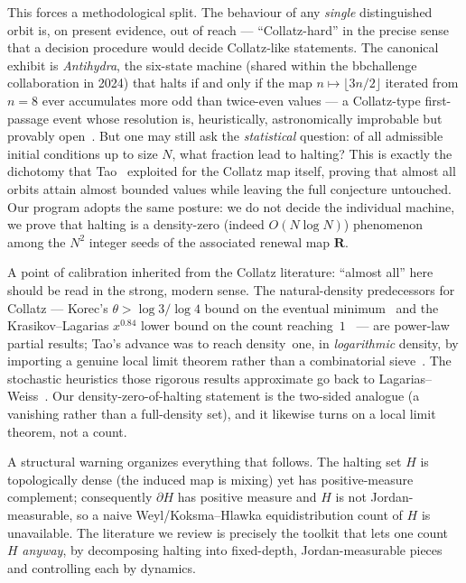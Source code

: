 \documentclass[11pt]{article}
\newcommand{\R}{\mathbf{R}}
\begin{document}
This forces a methodological split. The behaviour of any \emph{single}
distinguished orbit is, on present evidence, out of reach --- ``Collatz-hard''
in the precise sense that a decision procedure would decide Collatz-like
statements. The canonical exhibit is \emph{Antihydra}, the six-state machine
(shared within the bbchallenge collaboration in 2024) that halts if and only if
the map $n\mapsto\lfloor3n/2\rfloor$ iterated from $n=8$ ever accumulates more
odd than twice-even values --- a Collatz-type first-passage event whose
resolution is, heuristically, astronomically improbable but provably
open~\cite{bbchallenge2024}. But one may still ask the \emph{statistical}
question: of all admissible initial conditions up to size $N$, what fraction
lead to halting? This is exactly the dichotomy that Tao~\cite{Tao2022}
exploited for the Collatz map itself, proving that almost all orbits attain
almost bounded values while leaving the full conjecture untouched. Our program
adopts the same posture: we do not decide the individual machine, we prove that
halting is a density-zero (indeed $O(N\log N)$) phenomenon among the $N^2$
integer seeds of the associated renewal map $\R$.

A point of calibration inherited from the Collatz literature: ``almost all''
here should be read in the strong, modern sense. The natural-density
predecessors for Collatz --- Korec's $\theta>\log3/\log4$ bound on the eventual
minimum~\cite{Korec1994} and the Krasikov--Lagarias $x^{0.84}$ lower bound on
the count reaching~$1$~\cite{KrasikovLagarias2003} --- are power-law partial
results; Tao's advance was to reach density~one, in \emph{logarithmic} density,
by importing a genuine local limit theorem rather than a combinatorial
sieve~\cite{Tao2022}. The stochastic heuristics those rigorous results
approximate go back to Lagarias--Weiss~\cite{LagariasWeiss1992}. Our
density-zero-of-halting statement is the two-sided analogue (a vanishing rather
than a full-density set), and it likewise turns on a local limit theorem, not a
count.

A structural warning organizes everything that follows. The halting set
$H$ is topologically dense (the induced map is mixing) yet has positive-measure
complement; consequently $\partial H$ has positive measure and $H$ is not
Jordan-measurable, so a naive Weyl/Koksma--Hlawka equidistribution count of $H$
is unavailable. The literature we review is precisely the toolkit that lets one
count $H$ \emph{anyway}, by decomposing halting into fixed-depth,
Jordan-measurable pieces and controlling each by dynamics.
\end{document}
